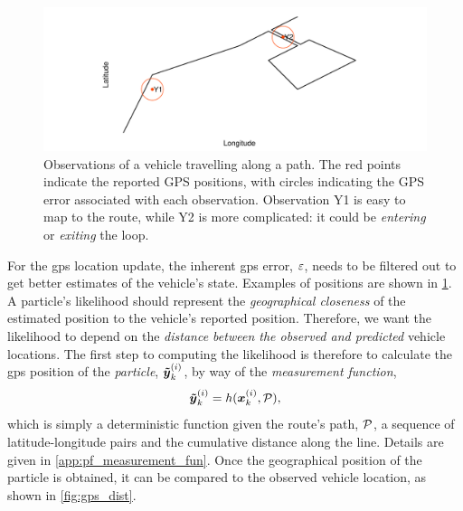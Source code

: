 \begin{knitrout}\small
{}\color{fgcolor}\begin{figure}
\includegraphics[width=\maxwidth]{figure/lhood_obs-1} \caption[Observations of a vehicle travelling along a path]{Observations of a vehicle travelling along a path. The red points indicate the reported GPS positions, with circles indicating the GPS error associated with each observation. Observation Y1 is easy to map to the route, while Y2 is more complicated: it could be \emph{entering} or \emph{exiting} the loop.}\label{fig:lhood_obs}
\end{figure}


\end{knitrout}





For the \gls{gps} location update, the inherent \gls{gps} error, $\varepsilon$, needs to be filtered out to get better estimates of the vehicle's state. Examples of positions are shown in \cref{fig:lhood_obs}. A particle's likelihood should represent the \emph{geographical closeness} of the estimated position to the vehicle's reported position. Therefore, we want the likelihood to depend on the \emph{distance between the observed and predicted} vehicle locations. The first step to computing the likelihood is therefore to calculate the \gls{gps} position of the \emph{particle}, $\boldsymbol{\tilde y}^{(i)}_k$, by way of the \emph{measurement function},
\begin{equation}
\label{eq:pf_measurement_fun}
\boldsymbol{\tilde y}^{(i)}_k = h(\boldsymbol x^{(i)}_k, \mathcal{P}),
\end{equation}
which is simply a deterministic function given the route's path, $\mathcal{P}$, a sequence of latitude-longitude pairs and the cumulative distance along the line. Details are given in \cref{app:pf_measurement_fun}. Once the geographical position of the particle is obtained, it can be compared to the observed vehicle location, as shown in \cref{fig:gps_dist}.


